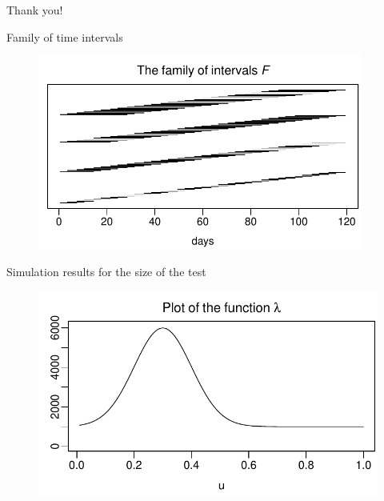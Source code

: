\documentclass[10pt, handout]{beamer}
\begin{document}
\begin{frame}[standout]
  Thank you!
\end{frame}


\appendix

\begin{frame}{Family of time intervals}
	\begin{figure}
		\includegraphics[width=0.95\textwidth]{plots/all_intervals}
	\end{figure}
\end{frame}

\begin{frame}{Simulation results for the size of the test}
\begin{figure}[t!]
	\includegraphics[height = 0.4\textheight]{plots/lambda_fct}
\end{figure}
\vspace{-2mm}
\scriptsize{\begin{table}[t]
\begin{center}
\caption{Size of the multiscale test}
\label{tab:size_shape}

\end{center}
\end{table}}
\end{frame}
\end{document}
